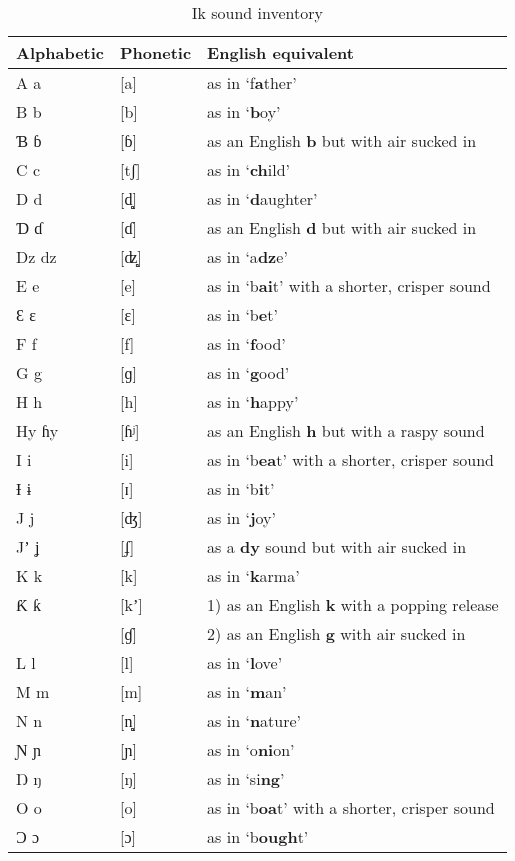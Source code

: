 \begin{table}
\caption{Ik sound inventory}
\label{tab:phon:sounds}
\small
\begin{tabularx}{\textwidth}{llX}
\lsptoprule
Alphabetic & Phonetic & English equivalent\\
\midrule
A a & [a] & as in ‘f\textbf{a}ther’\\
B b & [b] & as in ‘\textbf{b}oy’\\
Ɓ  ɓ & [ɓ] & as an English \textbf{b} but with air sucked in\\
C c & [tʃ] & as in ‘\textbf{ch}ild’\\
D d & [d̻] & as in ‘\textbf{d}aughter’\\
Ɗ ɗ & [ɗ] & as an English \textbf{d} but with air sucked in\\
Dz dz & [ʣ̻] & as in ‘a\textbf{dz}e’\\
E e & [e] & as in ‘b\textbf{ai}t’ with a shorter, crisper sound\\
Ɛ ɛ & [ɛ] & as in ‘b\textbf{e}t’\\
F f & [f] & as in ‘\textbf{f}ood’\\
G g & [ɡ] & as in ‘\textbf{g}ood’\\
H h & [h] & as in ‘\textbf{h}appy’\\
Hy ɦy & [ɦʲ] & as an English \textbf{h} but with a raspy sound\\
I i & [i] & as in ‘b\textbf{ea}t’ with a shorter, crisper sound\\
Ɨ ɨ & [ɪ] & as in ‘b\textbf{i}t’\\
J j & [ʤ] & as in ‘\textbf{j}oy’\\
Jʼ ʝ & [ʄ] & as a \textbf{dy} sound but with air sucked in\\
K k & [k] & as in ‘\textbf{k}arma’\\
Ƙ ƙ & [kʼ] & 1) as an English \textbf{k} with a popping release\\
& [ɠ] & 2) as an English \textbf{g} with air sucked in\\
L l & [l] & as in ‘\textbf{l}ove’\\
M m & [m] & as in ‘\textbf{m}an’\\
N n & [n̻] & as in ‘\textbf{n}ature’\\
Ɲ ɲ & [ɲ] & as in ‘o\textbf{ni}on’\\
Ŋ ŋ & [ŋ] & as in ‘si\textbf{ng}’\\
O o & [o] & as in ‘b\textbf{oa}t’ with a shorter, crisper sound\\
Ɔ ɔ & [ɔ] & as in ‘b\textbf{ough}t’\\

\end{tabularx}
\end{table}
